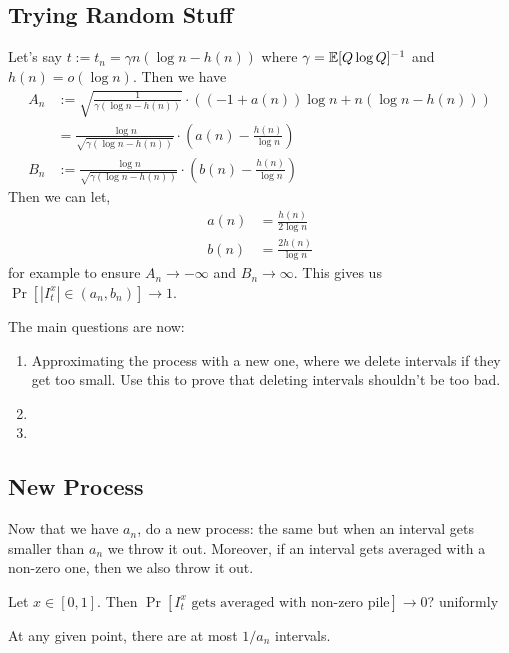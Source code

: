 \documentclass[12pt]{article}
\begin{document}
\subsection{Trying Random Stuff}

Let's say $t := t_n = \gamma n (\log n - h(n))$ where $\gamma = \mathbb{E}[Q \log Q]^{-1}$ and $h(n) = o(\log n)$. Then we have 
\begin{align*}
	A_n & := \sqrt{\frac{1}{\gamma (\log n - h(n))}} \cdot \left ( (-1 + a(n)) \log n + n(\log n - h(n)) \right ) \\
	& = \frac{\log n}{\sqrt{\gamma (\log n - h(n)) }} \cdot \left ( a(n) - \frac{h(n)}{\log n} \right ) \\
	B_n & := \frac{\log n}{\sqrt{\gamma (\log n - h(n)) }} \cdot \left ( b(n) - \frac{h(n)}{\log n} \right )
\end{align*}
Then we can let, 
\begin{align*}
	a(n) & = \frac{h(n)}{2 \log n} \\
	b(n) & = \frac{2h(n)}{\log n}
\end{align*}
for example to ensure $A_n \to - \infty$ and $B_n \to \infty$. This gives us $\Pr[|I_t^x| \in (a_n, b_n)] \to 1$.

The main questions are now:

\begin{enumerate}[label = (\alph*)]
	\item Approximating the process with a new one, where we delete intervals if they get too small. Use this to prove that deleting intervals shouldn't be too bad. 

	\item 

	\item 
\end{enumerate}

\subsection{New Process}

Now that we have $a_n$, do a new process: the same but when an interval gets smaller than $a_n$ we throw it out. Moreover, if an interval gets averaged with a non-zero one, then we also throw it out. 

\begin{question}
	Let $x \in [0, 1]$. Then $\Pr[I_t^x \text{ gets averaged with non-zero pile}] \to 0$? uniformly
\end{question}

At any given point, there are at most $1/a_n$ intervals. 
\newpage 
\end{document}
